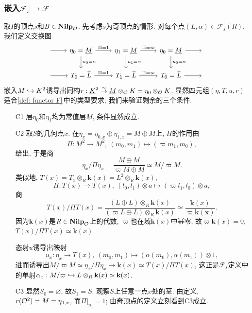 \subsubsection{嵌入$\mathcal{F}_s\to\mathcal{F}$}
取$I$的顶点$s$和$B\in\mathbf{Nilp}_{\mathcal{O}}$.
先考虑$s$为奇顶点的情形. 对每个点$(L, \alpha)\in \mathcal{F}_s(R)$, 我们定义交换图\[
\begin{tikzcd}
{} \arrow[r] & \eta_0=\underline{M} \arrow[r, "\Pi=1"] \arrow[d, "u_0=\alpha"] & \eta_1=\underline{M} \arrow[r, "\Pi=\varpi"] \arrow[d, "u_1=\alpha"] & \eta_0=\underline{M} \arrow[r] \arrow[d, "u_0=\alpha"] & {} \\
{} \arrow[r] & T_0=\tilde{L} \arrow[r, "\Pi=1"]                         & T_1=\tilde{L} \arrow[r, "\Pi=\varpi"]                         & T_0=\tilde{L} \arrow[r]                         & {}
\end{tikzcd}\]
嵌入$M\hookrightarrow K^2$诱导出同构$r : \underline{K}^2\stackrel{\sim}{\rightarrow}\underline{M}\otimes_{\mathcal{O}} K = \eta_0\otimes_{\mathcal{O}} K$.
显然四元组$(\eta, T, u, r)$适合\cref{def: functor F}\,中的类型要求;
我们来验证剩余的三个条件.
\begin{enumerate}
    \item [C1]
    层$\eta_0$和$\eta_1$均为常值层$\underline{M}$, 条件显然成立. 
    \item [C2]
    取$S$的几何点$x$.
    在$\eta_x = \eta_{0, x} \oplus\eta_{1, x} = M\oplus M$上, $\Pi$的作用由\[\Pi : M^2\to M^2,\ (m_0, m_1)\mapsto (\varpi m_1, m_0),\]
    给出, 于是商\[\eta_x/\Pi\eta_x = \frac{M\oplus M}{\varpi M\oplus M}\simeq M/\varpi M.\]
    类似地, $T(x) = T_x\otimes_{R}\mathbf{k}(x) = L^2\otimes_R\mathbf{k}(x)$, \[\Pi : T(x) \to T(x),\ (l_0, l_1)\otimes a\mapsto (\varpi l_1, l_0)\otimes a,\]
    商\[T(x)/\Pi T(x) = \frac{(L\oplus L)\otimes_R\mathbf{k}(x)}{(\varpi L\oplus L)\otimes_R\mathbf{k}(x)}\simeq \frac{\mathbf{k}(x)}{\varpi\mathbf{k(x)}}.\]
    因为$\mathbf{k}(x)$是$R\in\mathbf{Nilp}_{\mathcal{O}}$上的代数, $\varpi$也在域$\mathbf{k}(x)$中幂零, 故$\varpi \mathbf{k}(x) = 0$, $T(x)/\Pi T(x)\simeq \mathbf{k}(x)$.
    
    态射$u$诱导出映射\[u_x : \eta_x\to T(x),\ (m_0, m_1)\mapsto (\alpha(m_0), \alpha(m_1))\otimes 1,\]
    进而诱导出$M/\varpi M\simeq\eta_x/\Pi\eta_x \to \mathbf{k}(x)\simeq T(x)/\Pi T(x)$,
    这正是$\mathcal{F}_s$定义中的单射$\alpha_x : M/\varpi\hookrightarrow L\otimes_R\mathbf{k}(x)\simeq\mathbf{k}(x)$.
    
    \item [C3]
    显然$S_0 = \varnothing$, 故$S_1 = S$. 观察$S$上任意一点$x$处的茎.
    由定义, $r(\mathcal{O}^2) = M = \eta_{0, x}$, 而$\Pi|_{\eta_0} = 1$; 由奇顶点的定义立刻看到C3成立.
\end{enumerate}

